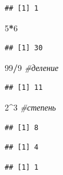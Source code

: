 \documentclass[]{book}
\newenvironment{Shaded}{\begin{snugshade}}{\end{snugshade}}
\newcommand{\DecValTok}[1]{\textcolor[rgb]{0.00,0.00,0.81}{#1}}
\newcommand{\StringTok}[1]{\textcolor[rgb]{0.31,0.60,0.02}{#1}}
\newcommand{\CommentTok}[1]{\textcolor[rgb]{0.56,0.35,0.01}{\textit{#1}}}
\newcommand{\OperatorTok}[1]{\textcolor[rgb]{0.81,0.36,0.00}{\textbf{#1}}}
\begin{document}
\begin{verbatim}
## [1] 1
\end{verbatim}

\begin{Shaded}
\begin{Highlighting}[]
\DecValTok{5}\OperatorTok{*}\DecValTok{6}
\end{Highlighting}
\end{Shaded}

\begin{verbatim}
## [1] 30
\end{verbatim}

\begin{Shaded}
\begin{Highlighting}[]
\DecValTok{99}\OperatorTok{/}\DecValTok{9} \CommentTok{#деление}
\end{Highlighting}
\end{Shaded}

\begin{verbatim}
## [1] 11
\end{verbatim}

\begin{Shaded}
\begin{Highlighting}[]
\DecValTok{2}\OperatorTok{^}\DecValTok{3} \CommentTok{#степень}
\end{Highlighting}
\end{Shaded}

\begin{verbatim}
## [1] 8
\end{verbatim}

\begin{Shaded}
\end{Shaded}

\begin{verbatim}
## [1] 4
\end{verbatim}

\begin{Shaded}
\end{Shaded}

\begin{verbatim}
## [1] 1
\end{verbatim}
\end{document}
